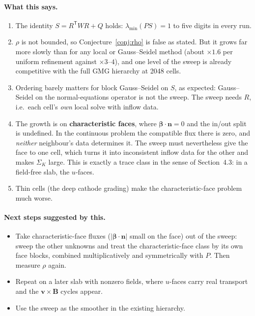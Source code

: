 \documentclass[11pt]{article}
\theoremstyle{remark}
\theoremstyle{definition}
\newcommand{\bbeta}{\boldsymbol{\beta}}
\newcommand{\bn}{\boldsymbol{n}}
\newcommand{\bv}{\boldsymbol{v}}
\newcommand{\bB}{\boldsymbol{B}}
\newcommand{\T}{\mathsf{T}}
\begin{document}
\paragraph{What this says.}
\begin{enumerate}[nosep]
  \item The identity $S=R^\T WR+Q$ holds: $\lambda_{\min}(PS)=1$ to five digits in every run.
  \item $\rho$ is not bounded, so Conjecture~\ref{conj:rho} is false as stated.  But it grows far more slowly than for
        any local or Gauss--Seidel method (about $\times1.6$ per uniform refinement against $\times3$--$4$), and one level
        of the sweep is already competitive with the full GMG hierarchy at 2048 cells.
  \item Ordering barely matters for block Gauss--Seidel on $S$, as expected: Gauss--Seidel on the normal-equations
        operator is not the sweep.  The sweep needs $R$, i.e.\ each cell's \emph{own} local solve with inflow data.
  \item The growth is on \textbf{characteristic faces}, where $\bbeta\cdot\bn=0$ and the in/out split is undefined.
        In the continuous problem the compatible flux there is zero, and \emph{neither} neighbour's data determines it.
        The sweep must nevertheless give the face to one cell, which turns it into inconsistent inflow data for the
        other and makes $\Sigma_K$ large.  This is exactly a trace class in the sense of Section~4.3: in a field-free
        slab, the $u$-faces.
  \item Thin cells (the deep cathode grading) make the characteristic-face problem much worse.
\end{enumerate}

\paragraph{Next steps suggested by this.}
\begin{itemize}[nosep]
  \item Take characteristic-face fluxes ($|\bbeta\cdot\bn|$ small on the face) out of the sweep: sweep the other
        unknowns and treat the characteristic-face class by its own face blocks, combined multiplicatively and
        symmetrically with $P$.  Then measure $\rho$ again.
  \item Repeat on a later slab with nonzero fields, where $u$-faces carry real transport and the $\bv\times\bB$ cycles
        appear.
  \item Use the sweep as the smoother in the existing hierarchy.
\end{itemize}
\end{document}
